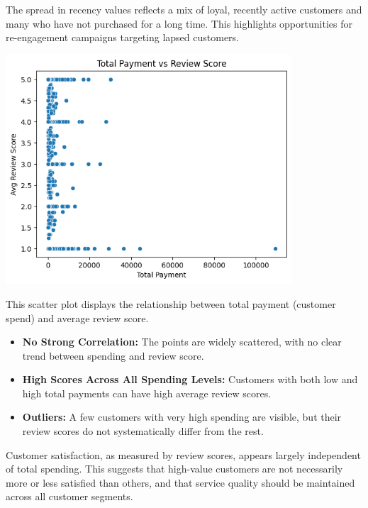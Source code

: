 \documentclass[a4paper]{article}
\begin{document}
\begin{multicols}{2}
The spread in recency values reflects a mix of loyal, recently active customers and many who have not purchased for a long time. This highlights opportunities for re-engagement campaigns targeting lapsed customers.

\vspace{1em}

\noindent
\begin{minipage}{\columnwidth}
\centering
\includegraphics[width=0.8\textwidth]{Total Payment vs Review Score.png}
\label{fig:total_payment_vs_review}
\end{minipage}

This scatter plot displays the relationship between total payment (customer spend) and average review score.

\begin{itemize}
    \item \textbf{No Strong Correlation:} The points are widely scattered, with no clear trend between spending and review score.
    \item \textbf{High Scores Across All Spending Levels:} Customers with both low and high total payments can have high average review scores.
    \item \textbf{Outliers:} A few customers with very high spending are visible, but their review scores do not systematically differ from the rest.
\end{itemize}

Customer satisfaction, as measured by review scores, appears largely independent of total spending. This suggests that high-value customers are not necessarily more or less satisfied than others, and that service quality should be maintained across all customer segments.



\end{multicols}
\end{document}
